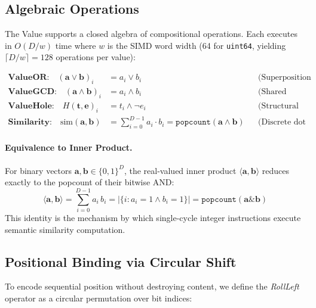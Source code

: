 \subsection{Algebraic Operations}
\label{sec:value_algebra}

The Value supports a closed algebra of compositional operations.  Each
executes in $O(D/w)$ time where $w$ is the SIMD word width (64 for
\texttt{uint64}, yielding $\lceil D/w \rceil = 128$ operations per value):

\begin{align}
  \textbf{ValueOR:}\quad
    (\mathbf{a} \lor \mathbf{b})_i
    &= a_i \lor b_i
    &&\text{(Superposition / LCM)}
    \label{eq:value_or} \\[4pt]
  \textbf{ValueGCD:}\quad
    (\mathbf{a} \land \mathbf{b})_i
    &= a_i \land b_i
    &&\text{(Shared factors / Intersection)}
    \label{eq:value_gcd} \\[4pt]
  \textbf{ValueHole:}\quad
    H(\mathbf{t}, \mathbf{e})_i
    &= t_i \land \lnot e_i
    &&\text{(Structural Vacuum)}
    \label{eq:value_hole} \\[4pt]
  \textbf{Similarity:}\quad
    \text{sim}(\mathbf{a}, \mathbf{b})
    &= \sum_{i=0}^{D-1} a_i \cdot b_i
    = \texttt{popcount}(\mathbf{a} \land \mathbf{b})
    &&\text{(Discrete dot product)}
    \label{eq:value_sim}
\end{align}

\paragraph{Equivalence to Inner Product.}
For binary vectors $\mathbf{a}, \mathbf{b} \in \{0,1\}^D$, the real-valued
inner product $\langle \mathbf{a}, \mathbf{b} \rangle$ reduces exactly to
the popcount of their bitwise AND:
\begin{equation}
  \langle \mathbf{a}, \mathbf{b} \rangle
  = \sum_{i=0}^{D-1} a_i \, b_i
  = \bigl| \{i : a_i = 1 \land b_i = 1\} \bigr|
  = \texttt{popcount}(\mathbf{a} \mathbin{\&} \mathbf{b})
  \label{eq:inner_product}
\end{equation}
This identity is the mechanism by which single-cycle integer instructions
execute semantic similarity computation.

\subsection{Positional Binding via Circular Shift}
\label{sec:roll_left}

To encode sequential position without destroying content, we define the
\emph{RollLeft} operator as a circular permutation over bit indices:


